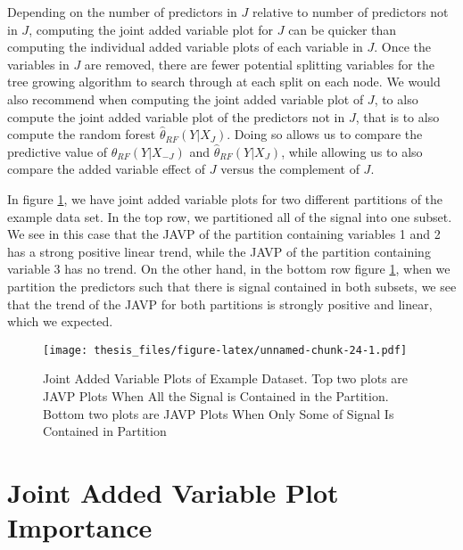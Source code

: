 \documentclass[12pt,twoside]{reedthesis}
\theoremstyle{definition}
\theoremstyle{definition}
\theoremstyle{definition}
\theoremstyle{remark}
\begin{document}
Depending on the number of predictors in \(J\) relative to number of
predictors not in \(J\), computing the joint added variable plot for
\(J\) can be quicker than computing the individual added variable plots
of each variable in \(J\). Once the variables in \(J\) are removed,
there are fewer potential splitting variables for the tree growing
algorithm to search through at each split on each node. We would also
recommend when computing the joint added variable plot of \(J\), to also
compute the joint added variable plot of the predictors not in \(J\),
that is to also compute the random forest \(\hat{\theta}_{RF}(Y|X_J)\).
Doing so allows us to compare the predictive value of
\(\hat{\theta}_{RF}(Y|X_{-J})\) and \(\hat{\theta}_{RF}(Y|X_J)\), while
allowing us to also compare the added variable effect of \(J\) versus
the complement of \(J\). \par

In figure \ref{JAVPex}, we have joint added variable plots for two
different partitions of the example data set. In the top row, we
partitioned all of the signal into one subset. We see in this case that
the JAVP of the partition containing variables 1 and 2 has a strong
positive linear trend, while the JAVP of the partition containing
variable 3 has no trend. On the other hand, in the bottom row figure
\ref{JAVPex}, when we partition the predictors such that there is signal
contained in both subsets, we see that the trend of the JAVP for both
partitions is strongly positive and linear, which we expected. \par
\begin{figure}
\centering
\texttt{[image: thesis\_files/figure-latex/unnamed-chunk-24-1.pdf]}
\caption{\label{fig:unnamed-chunk-24}\label{JAVPex}Joint Added Variable
Plots of Example Dataset. Top two plots are JAVP Plots When All the
Signal is Contained in the Partition. Bottom two plots are JAVP Plots
When Only Some of Signal Is Contained in Partition}
\end{figure}
\section{Joint Added Variable Plot
Importance}\label{joint-added-variable-plot-importance-1}
\end{document}
